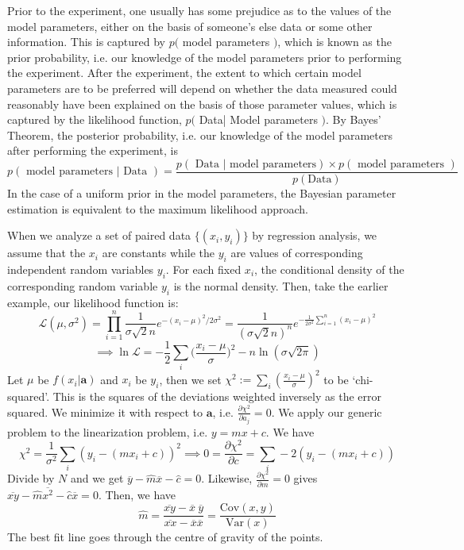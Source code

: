 \documentclass[a4paper]{article}
\begin{document}
\begin{Note}
Prior to the experiment, one usually has some prejudice as to the values of the model parameters, either on the basis of someone's else data or some other information. This is captured by $p($ model parameters $)$, which is known as the prior probability, i.e. our knowledge of the model parameters prior to performing the experiment. After the experiment, the extent to which certain model parameters are to be preferred will depend on whether the data measured could reasonably have been explained on the basis of those parameter values, which is captured by the likelihood function, $p($ Data| Model parameters $)$. By Bayes' Theorem, the posterior probability, i.e. our knowledge of the model parameters after performing the experiment, is
$$p(\text{ model parameters | Data })=\frac{p(\text{ Data | model parameters})\times p(\text{ model parameters })}{p(\text{Data})}$$
In the case of a uniform prior in the model parameters, the Bayesian parameter estimation is equivalent to the maximum likelihood approach.
\end{Note}
\begin{Note}
When we analyze a set of paired data $\{(x_i,y_i)\}$ by regression analysis, we assume that the $x_i$ are constants while the $y_i$ are values of corresponding independent random variables $y_i$. For each fixed $x_i$, the conditional density of the corresponding random variable $y_i$ is the normal density. Then, take the earlier example, our likelihood function is:
$$\mathcal{L}(\mu,\sigma^2)=\prod_{i=1}^n\frac{1}{\sigma\sqrt{2}n}e^{-(x_i-\mu)^2/2\sigma^2}=\frac{1}{(\sigma\sqrt{2}n)^n}e^{-\frac{1}{2\sigma^2}\sum_{i=1}^n(x_i-\mu)^2}$$
$$\implies\ln\mathcal{L}=-\frac{1}{2}\sum_i\bigg(\frac{x_i-\mu}{\sigma}\bigg)^2-n\ln(\sigma\sqrt{2\pi})$$
Let $\mu$ be $f(x_i|\mathbf{a})$ and $x_i$ be $y_i$, then we set $\chi^2:=\sum_i(\frac{x_i-\mu}{\sigma})^2$ to be `chi-squared'. This is the squares of the deviations weighted inversely as the error squared. We minimize it with respect to $\mathbf{a}$, i.e. $\frac{\partial\chi^2}{\partial a_j}=0$. We apply our generic problem to the linearization problem, i.e. $y=mx+c$. We have
$$\chi^2=\frac{1}{\sigma^2}\sum_i(y_i-(mx_i+c))^2\implies0=\frac{\partial\chi^2}{\partial c}=\sum_i-2(y_i-(mx_i+c))$$
Divide by $N$ and we get $\overline{y}-\hat{m}\overline{x}-\hat{c}=0$. Likewise, $\frac{\partial\chi^2}{\partial m}=0$ gives $\overline{xy}-\hat{m}\overline{x^2}-\hat{c}\overline{x}=0$. Then, we have
$$\hat{m}=\frac{\overline{xy}-\overline{x}~\overline{y}}{\overline{xx}-\overline{x}\overline{x}}=\frac{\text{Cov}(x,y)}{\text{Var}(x)}$$
The best fit line goes through the centre of gravity of the points.
\end{Note}
\end{document}
